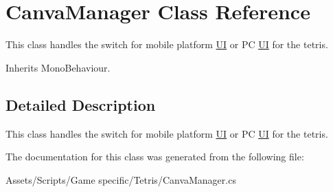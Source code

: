 \hypertarget{class_canva_manager}{\section{Canva\-Manager Class Reference}
\label{class_canva_manager}
}


This class handles the switch for mobile platform \hyperlink{class_u_i}{U\-I} or P\-C \hyperlink{class_u_i}{U\-I} for the tetris.  




Inherits Mono\-Behaviour.



\subsection{Detailed Description}
This class handles the switch for mobile platform \hyperlink{class_u_i}{U\-I} or P\-C \hyperlink{class_u_i}{U\-I} for the tetris. 



The documentation for this class was generated from the following file\-:\begin{DoxyCompactItemize}
\item 
Assets/\-Scripts/\-Game specific/\-Tetris/Canva\-Manager.\-cs\end{DoxyCompactItemize}
